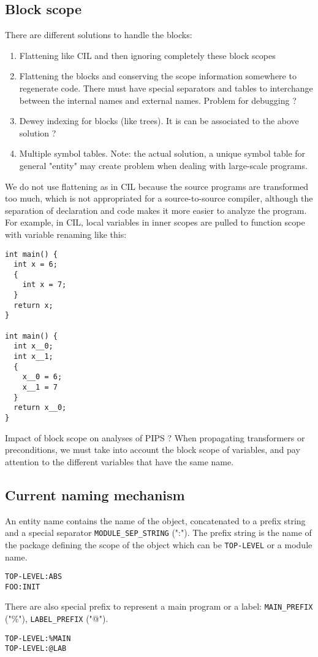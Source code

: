 \documentclass[a4paper]{article}
\begin{document}
\subsection{Block scope}
There are different solutions to handle the blocks:
\begin{enumerate}
\item Flattening like CIL \cite{Necu02} and then ignoring completely these block
  scopes
\item Flattening the blocks and conserving the scope information 
  somewhere to regenerate code. There must have special separators and tables
  to interchange between the internal names and external names. Problem for
  debugging ?
\item Dewey indexing for blocks (like trees). It is can be associated to
  the above solution ?
\item Multiple symbol tables. Note: the actual solution, a unique symbol table for general
"entity" may create problem when dealing with large-scale programs. 
\end{enumerate}
We do not use flattening as in CIL because the source
programs are transformed too much, which is not appropriated for a source-to-source
compiler, although the separation of declaration and code makes it more
easier to analyze the program. For example, in CIL, local variables in inner scopes are pulled to
function scope with variable renaming like this: 
\begin{verbatim}
int main() {
  int x = 6;
  {
    int x = 7;
  }
  return x;
}

int main() {
  int x__0;
  int x__1; 
  {
    x__0 = 6;
    x__1 = 7
  }
  return x__0;
}
\end{verbatim}
Impact of block scope on analyses of PIPS ? When propagating transformers or
preconditions, we must take into account the block scope of variables, and pay
attention to the different variables that have the same name.  

\subsection{Current naming mechanism}
An entity name contains the name of the object, concatenated to a prefix
string and a special separator \verb/MODULE_SEP_STRING/ (":"). The prefix
string is the name of the package defining the scope of the object which
can be \verb/TOP-LEVEL/ or a module name. 
\begin{verbatim}
TOP-LEVEL:ABS
FOO:INIT
\end{verbatim}  
There are also special prefix to represent a main program or a label:
\verb/MAIN_PREFIX/ ("\%"), \verb/LABEL_PREFIX/ ("@").
\begin{verbatim}
TOP-LEVEL:%MAIN
TOP-LEVEL:@LAB
\end{verbatim}  
\end{document}
